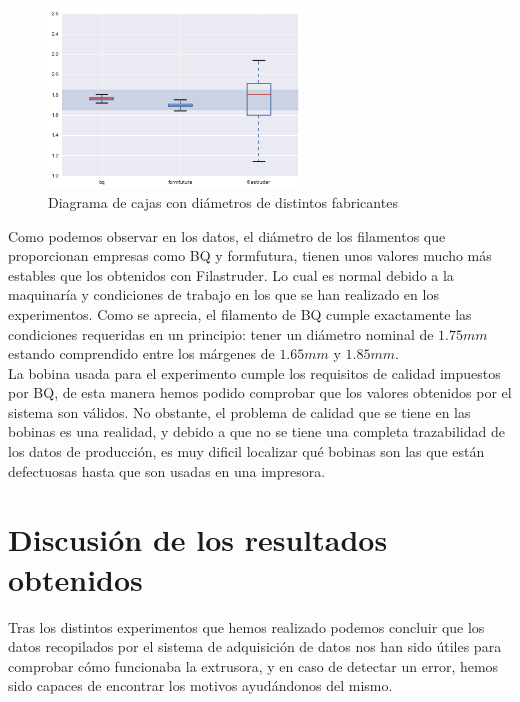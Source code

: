 \begin{figure}[H]
    \centering
    \includegraphics[width=0.6\textwidth]{images/producciones/conclusiones/output_9_1.png}
    \caption{Diagrama de cajas con diámetros de distintos fabricantes}
    \label{fig:concl_cajas5}
\end{figure}

Como podemos observar en los datos, el diámetro de los filamentos que proporcionan empresas como BQ y formfutura, tienen unos valores mucho más estables que los obtenidos con Filastruder. Lo cual es normal debido a la maquinaría y condiciones de trabajo en los que se han realizado en los experimentos. Como se aprecia, el filamento de BQ cumple exactamente las condiciones requeridas en un principio: tener un diámetro nominal de $1.75mm$ estando comprendido entre los márgenes de $1.65mm$ y $1.85mm$.\\

La bobina usada para el experimento cumple los requisitos de calidad impuestos por BQ, de esta manera hemos podido comprobar que los valores obtenidos por el sistema son válidos. No obstante, el problema de calidad que se tiene en las bobinas es una realidad, y debido a que no se tiene una completa trazabilidad de los datos de producción, es muy dificil localizar qué bobinas son las que están defectuosas hasta que son usadas en una impresora.

\section{Discusión de los resultados obtenidos}

Tras los distintos experimentos que hemos realizado podemos concluir que los datos recopilados por el sistema de adquisición de datos nos han sido útiles para comprobar cómo funcionaba la extrusora, y en caso de detectar un error, hemos sido capaces de encontrar los motivos ayudándonos del mismo.\\


